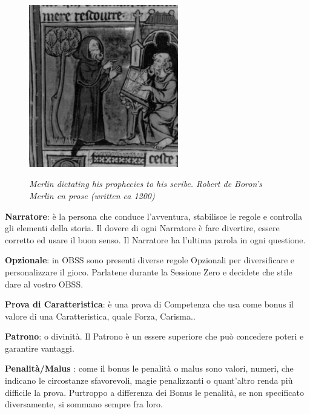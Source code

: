 \begin{multicols}{2}
\begin{figure}%

\centering
\includegraphics[width=6.5cm]{immagini/merlin.png}

\emph{Merlin dictating his prophecies to his scribe. Robert de Boron's Merlin en prose (written ca 1200)}
\end{figure}

%

\textbf{Narratore}: è la persona che conduce l'avventura, stabilisce le regole e controlla gli elementi della storia. Il dovere di ogni Narratore è fare divertire, essere corretto ed usare il buon senso. Il Narratore ha l'ultima parola in ogni questione.

\textbf{Opzionale}: in OBSS sono presenti diverse regole Opzionali per diversificare e personalizzare il gioco. Parlatene durante la Sessione Zero e decidete che stile dare al vostro OBSS.

\textbf{Prova di Caratteristica}: è una prova di Competenza che usa come bonus il valore di una Caratteristica, quale Forza, Carisma..

\textbf{Patrono}: o divinità. Il Patrono è un essere superiore che può concedere poteri e garantire vantaggi.

\textbf{Penalità/Malus} : come il bonus le penalità o malus sono valori, numeri, che indicano le circostanze sfavorevoli, magie penalizzanti o quant'altro renda più difficile la prova. Purtroppo a differenza dei Bonus le penalità, se non specificato diversamente, si sommano sempre fra loro.


\end{multicols}
